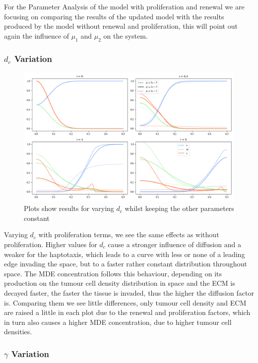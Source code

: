 For the Parameter Analysis of the model with proliferation and renewal we are focusing on comparing the results of the updated model with the results produced by the model without renewal and proliferation, this will point out again the influence of $\mu_1$ and $\mu_2$ on the system. 

\subsubsection*{$d_c$ Variation}
\begin{figure}[h]
    \centering
    \includegraphics[width=\textwidth]{resources/images/prolif_dc_variation.png}
    \caption{Plots show results for varying $d_c$ whilst keeping the other parameters constant}
    \label{fig:prolif_dc_comparison}
\end{figure}

Varying $d_c$ with proliferation terms, we see the same effects as without proliferation. Higher values for $d_c$ cause a stronger influence of diffusion and a weaker for the haptotaxis, which leads to a curve with less or none of a leading edge invading the space, but to a faster rather constant distribution throughout space. The MDE concentration follows this behaviour, depending on its production on the tumour cell density distribution in space and the ECM is decayed faster, the faster the tissue is invaded, thus the higher the diffusion factor is. Comparing them we see little differences, only tumour cell density and ECM are raised a little in each plot due to the renewal and proliferation factors, which in turn also causes a higher MDE concentration, due to higher tumour cell densities. 


\subsubsection*{$\gamma$ Variation}


